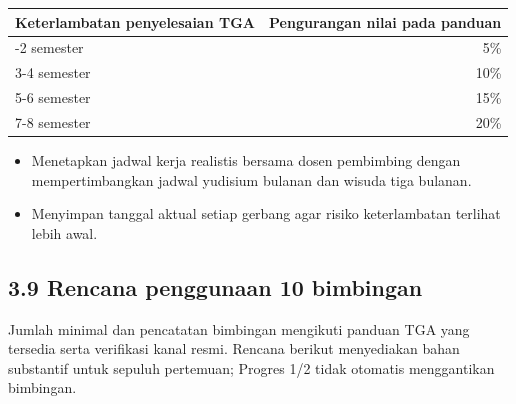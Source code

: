 \documentclass[
  indonesian,
  11pt,
]{article}
\newcounter{none} %
\providecommand{\tightlist}{%
  \setlength{\itemsep}{0pt}\setlength{\parskip}{0pt}}
\renewcommand{\tightlist}{%
  \setlength{\itemsep}{0.22em}%
  \setlength{\parskip}{0pt}%
}
\begin{document}
{\def\LTcaptype{none} %
\begin{longtable}[]{@{}lr@{}}
\toprule\noalign{}
Keterlambatan penyelesaian TGA & Pengurangan nilai pada panduan \\
\midrule\noalign{}
\endhead
\bottomrule\noalign{}
\endlastfoot
1-2 semester & 5\% \\
3-4 semester & 10\% \\
5-6 semester & 15\% \\
7-8 semester & 20\% \\
\end{longtable}
}

\begin{itemize}
\tightlist
\item[$\square$]
  Menetapkan jadwal kerja realistis bersama dosen pembimbing dengan
  mempertimbangkan jadwal yudisium bulanan dan wisuda tiga bulanan.
\item[$\square$]
  Menyimpan tanggal aktual setiap gerbang agar risiko keterlambatan
  terlihat lebih awal.
\end{itemize}

\subsection{3.9 Rencana penggunaan 10
bimbingan}\label{rencana-penggunaan-10-bimbingan}

Jumlah minimal dan pencatatan bimbingan mengikuti panduan TGA yang
tersedia serta verifikasi kanal resmi. Rencana berikut menyediakan bahan
substantif untuk sepuluh pertemuan; Progres 1/2 tidak otomatis
menggantikan bimbingan.
\end{document}
